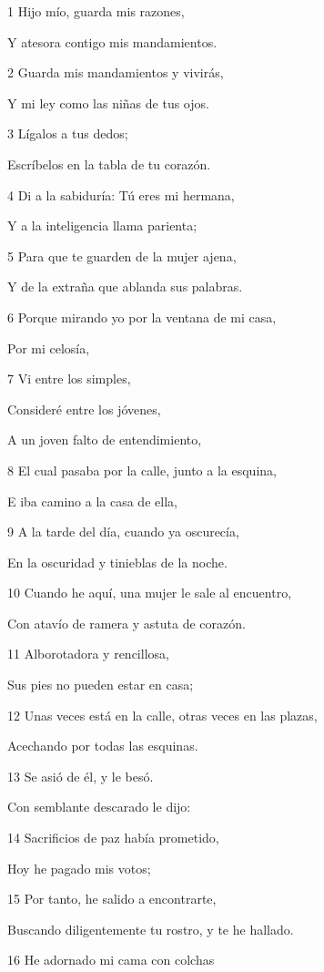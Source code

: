 \par 1 Hijo mío, guarda mis razones,
\par Y atesora contigo mis mandamientos.
\par 2 Guarda mis mandamientos y vivirás,
\par Y mi ley como las niñas de tus ojos.
\par 3 Lígalos a tus dedos;
\par Escríbelos en la tabla de tu corazón.
\par 4 Di a la sabiduría: Tú eres mi hermana,
\par Y a la inteligencia llama parienta;
\par 5 Para que te guarden de la mujer ajena,
\par Y de la extraña que ablanda sus palabras.
\par 6 Porque mirando yo por la ventana de mi casa,
\par Por mi celosía,
\par 7 Vi entre los simples,
\par Consideré entre los jóvenes,
\par A un joven falto de entendimiento,
\par 8 El cual pasaba por la calle, junto a la esquina,
\par E iba camino a la casa de ella,
\par 9 A la tarde del día, cuando ya oscurecía, 
\par En la oscuridad y tinieblas de la noche.
\par 10 Cuando he aquí, una mujer le sale al encuentro,
\par Con atavío de ramera y astuta de corazón.
\par 11 Alborotadora y rencillosa,
\par Sus pies no pueden estar en casa;
\par 12 Unas veces está en la calle, otras veces en las plazas,
\par Acechando por todas las esquinas.
\par 13 Se asió de él, y le besó.
\par Con semblante descarado le dijo:
\par 14 Sacrificios de paz había prometido,
\par Hoy he pagado mis votos;
\par 15 Por tanto, he salido a encontrarte,
\par Buscando diligentemente tu rostro, y te he hallado.
\par 16 He adornado mi cama con colchas
